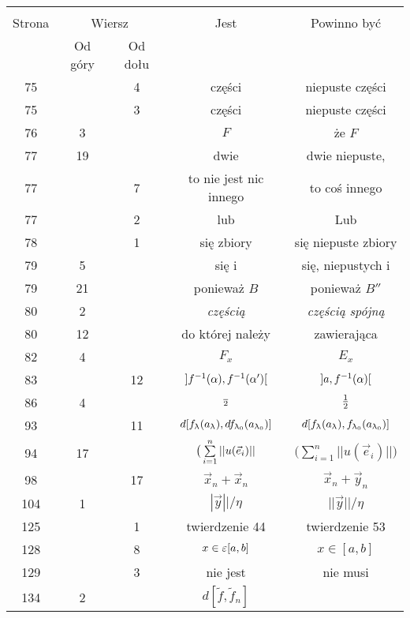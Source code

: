 \documentclass[a4paper,11pt]{article}
\begin{document}
\begin{center}
  \begin{tabular}{|c|c|c|c|c|}
    \hline
    & \multicolumn{2}{c|}{} & & \\
    Strona & \multicolumn{2}{c|}{Wiersz} & Jest
                              & Powinno być \\ \cline{2-3}
    & Od góry & Od dołu & & \\
    \hline
    75  & &  4 & części & niepuste części \\
    75  & &  3 & części & niepuste części \\
    76  &  3 & & $F$ & że $F$ \\
    77  & 19 & & dwie & dwie niepuste, \\
    77  & &  7 & to nie jest nic innego & to coś innego \\
    77  & &  2 & lub & Lub \\
    78  & &  1 & się zbiory & się niepuste zbiory \\
    79  &  5 & & się i & się, niepustych i \\
    79  & 21 & & ponieważ $B$ & ponieważ $B''$ \\
    80  &  2 & & \emph{częścią} & \emph{częścią spójną} \\
    80  & 12 & & do której należy & zawierająca \\
    82  &  4 & & $F_{ x }$ & $E_{ x }$ \\
    83  & & 12 & $] f^{ - 1 }( \alpha ), f^{ -1 }( \alpha' ) [$
           & $] a, f^{ -1 }( \alpha ) [$ \\
    86  &  4 & & $\frac{ }{ 2 }$ & $\frac{ 1 }{ 2 }$ \\
    93  & & 11 & $d[ f_{ \uplambda }( a_{ \uplambda } ), df_{ \uplambda_{ 0 } }( a_{ \uplambda_{ 0 } } ) ]$
           & $d[ f_{ \uplambda }( a_{ \uplambda } ), f_{ \uplambda_{ 0 } }( a_{ \uplambda_{ 0 } } ) ]$ \\
    94  & 17 & & $\big( \sum\limits_{ i = 1 }^{ n } | | u( \vec{ e }_{ i } ) | |$
           & $\big( \sum_{ i = 1 }^{ n } | | u( \vec{ e }_{ i } ) | | \big)$ \\
    98  & & 17 & $\vec{ x }_{ n } + \vec{ x }_{ n }$
           & $\vec{ x }_{ n } + \vec{ y }_{ n }$ \\
    104 &  1 & & $| \vec{ y } || / \eta$ & $|| \vec{ y } || / \eta$ \\
    125 & &  1 & twierdzenie 44 & twierdzenie 53 \\
    128 & &  8 & $x \in \varepsilon [ a, b ]$ & $x \in [ a, b ]$ \\
    129 & &  3 & nie jest & nie musi \\
    134 &  2 & & $d[ \tilde{ f }, \tilde{ f }_{ n } ]$

\end{tabular}
\end{center}
\end{document}
